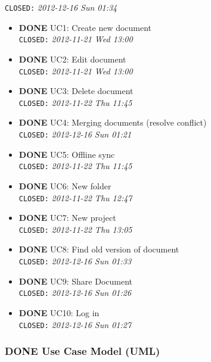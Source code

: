 \documentclass[11pt,a4paper]{article}
\begin{document}
    \texttt{CLOSED:} \textit{2012-12-16 Sun 01:34}
\begin{itemize}

\item \textbf{DONE} UC1: Create new document\\
\label{sec-1-2-1-1}%
\texttt{CLOSED:} \textit{2012-11-21 Wed 13:00}


\item \textbf{DONE} UC2: Edit document\\
\label{sec-1-2-1-2}%
\texttt{CLOSED:} \textit{2012-11-21 Wed 13:00}


\item \textbf{DONE} UC3: Delete document\\
\label{sec-1-2-1-3}%
\texttt{CLOSED:} \textit{2012-11-22 Thu 11:45}


\item \textbf{DONE} UC4: Merging documents (resolve conflict)\\
\label{sec-1-2-1-4}%
\texttt{CLOSED:} \textit{2012-12-16 Sun 01:21}


\item \textbf{DONE} UC5: Offline sync\\
\label{sec-1-2-1-5}%
\texttt{CLOSED:} \textit{2012-11-22 Thu 11:45}


\item \textbf{DONE} UC6: New folder\\
\label{sec-1-2-1-6}%
\texttt{CLOSED:} \textit{2012-11-22 Thu 12:47}


\item \textbf{DONE} UC7: New project\\
\label{sec-1-2-1-7}%
\texttt{CLOSED:} \textit{2012-11-22 Thu 13:05}


\item \textbf{DONE} UC8: Find old version of document\\
\label{sec-1-2-1-8}%
\texttt{CLOSED:} \textit{2012-12-16 Sun 01:33}


\item \textbf{DONE} UC9: Share Document\\
\label{sec-1-2-1-9}%
\texttt{CLOSED:} \textit{2012-12-16 Sun 01:26}


\item \textbf{DONE} UC10: Log in\\
\label{sec-1-2-1-10}%
\texttt{CLOSED:} \textit{2012-12-16 Sun 01:27}

\end{itemize} %
\subsubsection{\textbf{DONE} Use Case Model (UML)}
\label{sec-1-2-2}
\end{document}
